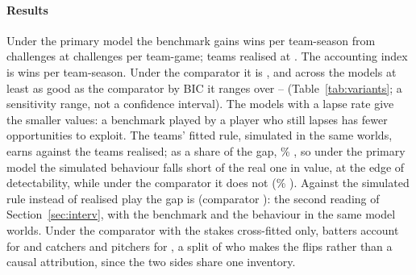 \documentclass[aoas]{imsart}
\theoremstyle{plain}
\theoremstyle{definition}
\begin{document}
\paragraph{Results} Under the primary model the benchmark gains \GapBench{} \GapBenchCI{} wins per team-season from
challenges at \GapNBench{} challenges per team-game; teams realised \GapObs{} \GapObsCI{} at \GapNObs. The accounting index is \Gap{} \GapCI{} wins per team-season. Under the comparator it is
\GapMain{} \GapMainCI, and across the \PCFNModels{} models at least as good as the comparator by BIC it ranges over
\PCFLo--\PCFHi{} (Table~\ref{tab:variants}; a sensitivity range, not a confidence interval). The models with a lapse
rate give the smaller values: a benchmark played by a player who still lapses has fewer opportunities to exploit. The teams' fitted rule, simulated in the same worlds, earns \GapFitRuleWins{} against the \GapObs{} teams realised;
as a share of the gap, \GapFitRuleGapPct\% \GapFitRuleCI, so under the primary model the simulated behaviour falls short of the real one in value, at the edge of
detectability, while under the comparator it does not (\GapMainFitRuleGapPct\%
\GapMainFitRuleCI). Against the simulated rule instead of realised play the gap is \GapSimRuleGap{} \GapSimRuleGapCI{}
(comparator \GapMainSimRuleGap): the second reading of Section~\ref{sec:interv}, with the benchmark and the behaviour in
the same model worlds. Under the comparator with the stakes cross-fitted only, batters account for \WinsLostBatter{}
\WinsLostBatterCI{} and catchers and pitchers for \WinsLostFielder{} \WinsLostFielderCI, a split of who makes the flips
rather than a causal attribution, since the two sides share one inventory.
\end{document}
